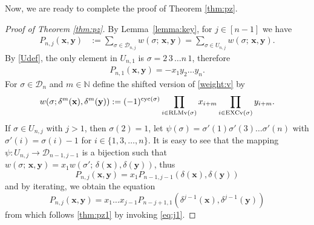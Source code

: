 \documentclass[12pt,reqno]{amsart}
\numberwithin{equation}{section}
\newcommand\cyc{\mathop{ \rm cyc}}
\def\D{\mathcal{D}}
\def\N{\mathbb{ N}}
\def\x{\mathbf{ x}}
\def\y{\mathbf{ y}}
\def\cyc{\mathop{\rm cyc}}
\begin{document}
Now, we are ready to complete  the proof of 
Theorem \ref{thm:pz}.
\begin{proof} [Proof of Theorem \ref{thm:pz}]
By Lemma~\ref{lemma:key}, for $j\in [n-1]$  we have 
\begin{align*}
P_{n,j}(\mathbf{x}, \mathbf{y})&:=\sum_{\sigma\in \D_{n,j}}w(\sigma;\,\mathbf{x}, \mathbf{y})=
\sum_{\sigma\in U_{n,j}}w(\sigma;\,{\x},{\y}).
\end{align*}
By \eqref{Udef}, the only element in $U_{n,1}$ is  $\sigma=2\,3\,\ldots n\,1$,  therefore 
\begin{align}\label{eq:j1}
P_{n,1}(\mathbf{x}, \mathbf{y})
=-x_1y_2\ldots y_n. 
\end{align}
 For $\sigma\in\D_{n}$ and $m\in \N$ define the  shifted version of \eqref{weight:v} by
\begin{equation}
w(\sigma; \delta^m({\x}),\delta^m({\y}))
:=(-1)^{\cyc(\sigma)}\prod_{i\in \mathrm{RLMv}(\sigma)}x_{i+m}
\prod_{i\in \mathrm{EXCv}(\sigma)}y_{i+m}.
\end{equation}
  If  $\sigma\in U_{n,j}$ with  $j>1$, then   $\sigma(2)=1$,  
let  $\psi(\sigma)=\sigma'(1)\sigma'(3)\ldots \sigma'(n)$ with $\sigma'(i)=\sigma(i)-1$ for
$i\in \{1, 3, \ldots, n\}$. 
It is easy to see that 
the  mapping $\psi:U_{n,j}\to \D_{n-1,j-1}$ is a bijection such  that
$w(\sigma;\, \x,\y)=x_1w(\sigma';\,\delta(\x),\delta(\y))$, thus
$$
P_{n,j}(\x,\y)=
x_1P_{n-1,j-1}(\delta(\x), \delta(\y))
$$
and by iterating, we obtain the equation
$$
P_{n,j}(\x,\y)=
x_1\ldots x_{j-1}P_{n-j+1,1}(\delta^{j-1}(\x), \delta^{j-1}(\y))
$$
from which follows  \eqref{thm:pz1}  by invoking \eqref{eq:j1}.
\end{proof}
\end{document}
